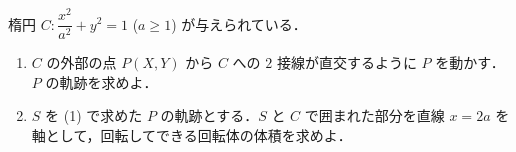 \documentclass[../../main.tex]{subfiles}
\begin{document}
楕円 $C: \dfrac{x^2}{a^2} + y^2 = 1$ ($a \ge 1$) が与えられている．
\begin{enumerate}
  \item $C$ の外部の点 $P(X,Y)$ から $C$ への $2$ 接線が直交するように $P$ を動かす．$P$ の軌跡を求めよ．
  \item $S$ を (1) で求めた $P$ の軌跡とする．$S$ と $C$ で囲まれた部分を直線 $x=2a$ を軸として，回転してできる回転体の体積を求めよ．
\end{enumerate}
\end{document}
